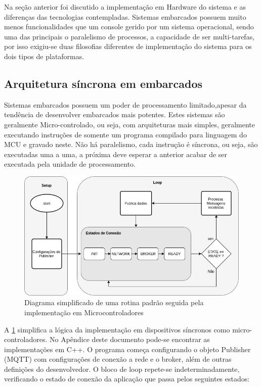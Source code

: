 Na seção anterior foi discutido a implementação em Hardware do sistema e as diferenças das tecnologias contempladas. Sistemas embarcados 
possuem muito menos funcionalidades que um console gerido por um sistema operacional, sendo uma das principais o paralelismo de processos, a capacidade de ser multi-tarefas, por isso exigiu-se duas filosofias diferentes de implementação do sistema para os dois tipos de plataformas.

\subsection{Arquitetura síncrona em embarcados}
\label{subsection:embarcados_sinc}

Sistemas embarcados possuem um poder de processamento limitado,apesar da tendência de desenvolver embarcados mais potentes. Estes sistemas são geralmente Micro-controlado, ou seja, com arquiteturas mais simples, geralmente executando instruções de somente um programa compilado para linguagem do MCU e gravado neste. Não há paralelismo, cada instrução é síncrona, ou seja, são executadas uma a uma, a próxima deve esperar a anterior acabar de ser executada pela unidade de processamento.

\begin{figure}[h!]
\centering
\includegraphics[width=12cm]{./02_Capitulos/02_Cap3/figures/sinc_implementation}
\caption{Diagrama simplificado de uma rotina padrão seguida pela implementação em Microcontroladores}
\label{fig:sinc-implementation}
\end{figure}

A \ref{fig:sinc-implementation} simplifica a lógica da implementação em dispositivos síncronos como micro-controladores. No Apêndice deste documento pode-se encontrar as implementações em C++. O programa começa configurando o objeto Publisher (MQTT) com configurações de conexão a rede e o broker, além de outras definições do desenvolvedor. O bloco de loop repete-se indeterminadamente, verificando o estado de conexão da aplicação que passa pelos seguintes estados:

